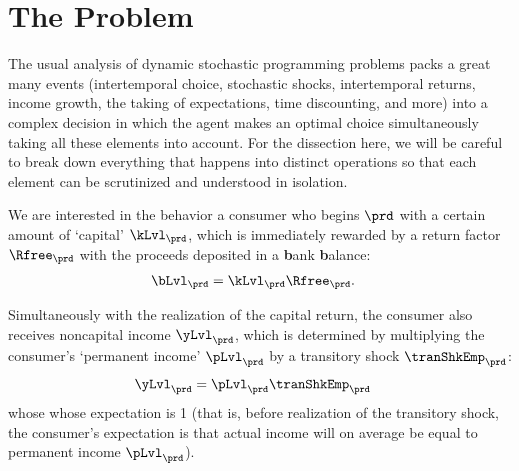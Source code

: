 
\hypertarget{the-problem}{}
\section{The Problem}\label{sec:the-problem}

The usual analysis of dynamic stochastic programming problems packs a great many events (intertemporal choice, stochastic shocks, intertemporal returns, income growth, the taking of expectations, time discounting, and more) into a complex decision in which the agent makes an optimal choice simultaneously taking all these elements into account. For the dissection here, we will be careful to break down everything that happens into distinct operations so that each element can be scrutinized and understood in isolation.

We are interested in the behavior a consumer who begins {\interval} $\prd$ with a certain amount of `capital' $\kLvl_{\prd}$, which is immediately rewarded by a return factor $\Rfree_{\prd}$  with the proceeds deposited in a \textbf{b}ank \textbf{b}alance:
\begin{equation}\begin{gathered}\begin{aligned}\label{eq:bLvl}
      \bLvl_{\prd} & = \kLvl_{\prd}\Rfree_{\prd}. 
    \end{aligned}\end{gathered}\end{equation}

Simultaneously with the realization of the capital return, the consumer also receives noncapital income $\yLvl_{\prd}$, which is determined by multiplying the consumer's `permanent income' $\pLvl_{\prd}$ by a transitory shock $\tranShkEmp_{\prd}$:
\begin{equation}\begin{gathered}\begin{aligned}
      \yLvl_{\prd} & = \pLvl_{\prd}\tranShkEmp_{\prd} \label{eq:yLvl}
    \end{aligned}\end{gathered}\end{equation}
whose whose expectation is 1 (that is, before realization of the transitory shock, the consumer's expectation is that actual income will on average be equal to permanent income $\pLvl_{\prd}$).

